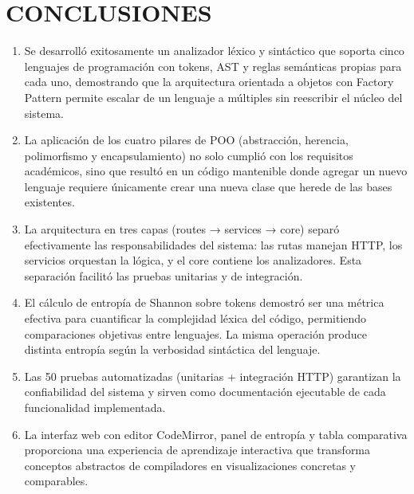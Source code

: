 \documentclass[12pt,a4paper]{article}
\begin{document}
\section{CONCLUSIONES}

\begin{enumerate}[label=\textbf{\arabic*.}]
    \item Se desarrolló exitosamente un analizador léxico y sintáctico que soporta cinco lenguajes de programación con tokens, AST y reglas semánticas propias para cada uno, demostrando que la arquitectura orientada a objetos con Factory Pattern permite escalar de un lenguaje a múltiples sin reescribir el núcleo del sistema.

    \item La aplicación de los cuatro pilares de POO (abstracción, herencia, polimorfismo y encapsulamiento) no solo cumplió con los requisitos académicos, sino que resultó en un código mantenible donde agregar un nuevo lenguaje requiere únicamente crear una nueva clase que herede de las bases existentes.

    \item La arquitectura en tres capas (routes → services → core) separó efectivamente las responsabilidades del sistema: las rutas manejan HTTP, los servicios orquestan la lógica, y el core contiene los analizadores. Esta separación facilitó las pruebas unitarias y de integración.

    \item El cálculo de entropía de Shannon sobre tokens demostró ser una métrica efectiva para cuantificar la complejidad léxica del código, permitiendo comparaciones objetivas entre lenguajes. La misma operación produce distinta entropía según la verbosidad sintáctica del lenguaje.

    \item Las 50 pruebas automatizadas (unitarias + integración HTTP) garantizan la confiabilidad del sistema y sirven como documentación ejecutable de cada funcionalidad implementada.

    \item La interfaz web con editor CodeMirror, panel de entropía y tabla comparativa proporciona una experiencia de aprendizaje interactiva que transforma conceptos abstractos de compiladores en visualizaciones concretas y comparables.
\end{enumerate}
\newpage
\end{document}
